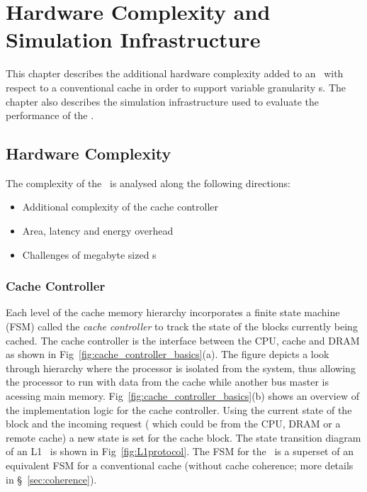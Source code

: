 
%
%

\chapter{Hardware Complexity and Simulation Infrastructure}
\label{chap:hardware_complexity_and_simulation}

This chapter describes the additional hardware complexity added to an \AC\ with respect to a conventional cache in order to support variable granularity \AB{}s. The chapter also describes the simulation infrastructure used to evaluate the performance of the \AC{}.

\section{Hardware Complexity}  
\label{sec:hardware_complexity}

The complexity of the \AC\ is analysed along the following directions:
\begin{itemize}
  \item Additional complexity of the cache controller
  \item Area, latency and energy overhead
  \item Challenges of megabyte sized \AC{}s
\end{itemize}


\subsection{Cache Controller} 

Each level of the cache memory hierarchy incorporates a finite state machine (FSM) called the \textit{cache controller} to track the state of the blocks currently being cached. The cache controller is the interface between the CPU, cache and DRAM as shown in Fig~\ref{fig:cache_controller_basics}(a). The figure depicts a look through hierarchy where the processor is isolated from the system, thus allowing the processor to run with data from the cache while another bus master is acessing main memory. Fig~\ref{fig:cache_controller_basics}(b) shows an overview of the implementation logic for the cache controller. Using the current state of the block and the incoming request ( which could be from the CPU, DRAM or a remote cache) a new state is set for the cache block. The state transition diagram of an L1 \AC\ is shown in Fig~\ref{fig:L1protocol}. The FSM for the \AC\ is a superset of an equivalent FSM for a conventional cache (without cache coherence; more details in \S~\ref{sec:coherence}).

